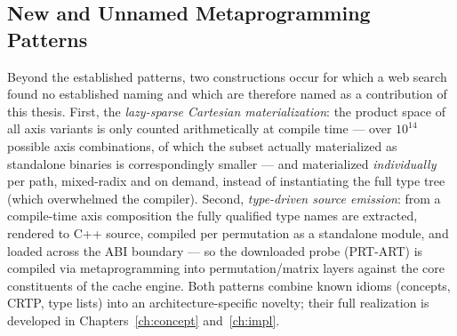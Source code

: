 \subsection{New and Unnamed Metaprogramming Patterns}\label{ssec:new-patterns}
Beyond the established patterns, two constructions occur for which a web search found no established
naming and which are therefore named as a contribution of this thesis. First, the
\emph{lazy-sparse Cartesian materialization}: the product space of all axis variants is only counted
arithmetically at compile time --- over $10^{14}$ possible axis combinations, of which the subset
actually materialized as standalone binaries is correspondingly smaller --- and materialized
\emph{individually} per path, mixed-radix and on demand, instead of instantiating the full type tree
(which overwhelmed the compiler). Second, \emph{type-driven source emission}: from a compile-time
axis composition the fully qualified type names are extracted, rendered to C++ source, compiled per
permutation as a standalone module, and loaded across the ABI boundary --- so the downloaded probe
(PRT-ART) is compiled via metaprogramming into permutation/matrix layers against the core
constituents of the cache engine. Both patterns combine known idioms (concepts, CRTP, type lists)
into an architecture-specific novelty; their full realization is developed in
Chapters~\ref{ch:concept} and~\ref{ch:impl}.
